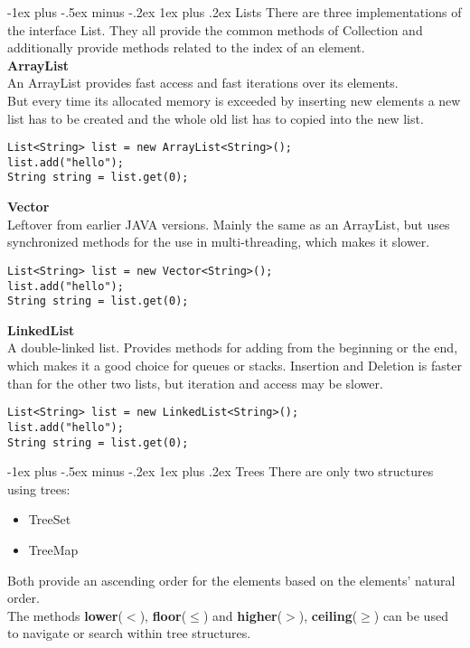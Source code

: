 \documentclass[10pt,landscape]{article}
\makeatletter
\renewcommand{\subsubsection}{\@startsection{subsubsection}{3}{0mm}%
                                {-1ex plus -.5ex minus -.2ex}%
                                {1ex plus .2ex}%
                                {\normalfont\small\bfseries}}
\makeatother
\begin{document}
\begin{multicols}{3}
\subsubsection{Lists}
There are three implementations of the interface List. They all provide the common methods of Collection and additionally provide methods related to the index of an element.\\
\textbf{ArrayList}\\
An ArrayList provides fast access and fast iterations over its elements.\\
But every time its allocated memory is exceeded by inserting new elements a new list has to be created and the whole old list has to copied into the new list.\\
\begin{lstlisting}
List<String> list = new ArrayList<String>();
list.add("hello");
String string = list.get(0);
\end{lstlisting}
\textbf{Vector}\\
Leftover from earlier JAVA versions. Mainly the same as an ArrayList, but uses synchronized methods for the use in multi-threading, which makes it slower.\\
\begin{lstlisting}
List<String> list = new Vector<String>();
list.add("hello");
String string = list.get(0);
\end{lstlisting}
\textbf{LinkedList}\\
A double-linked list. Provides methods for adding from the beginning or the end, which makes it a good choice for queues or stacks. Insertion and Deletion is faster than for the other two lists, but iteration and access may be slower.
\begin{lstlisting}
List<String> list = new LinkedList<String>();
list.add("hello");
String string = list.get(0);
\end{lstlisting}
\subsubsection{Trees}
There are only two structures using trees:
\begin{itemize}
\item TreeSet
\item TreeMap
\end{itemize}
Both provide an ascending order for the elements based on the elements' natural order.\\
The methods \textbf{lower}($<$), \textbf{floor}($\leq$) and \textbf{higher}($>$), \textbf{ceiling}($\geq$) can be used to navigate or search within tree structures.\\


\end{multicols}
\end{document}
